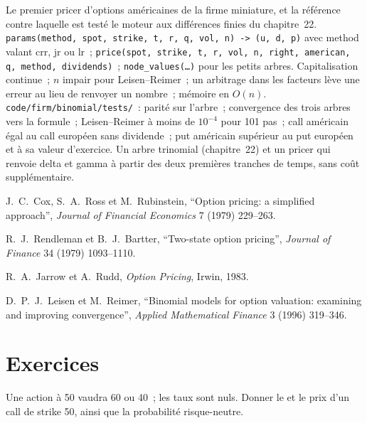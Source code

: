 \begin{build}
 Le premier pricer d'options américaines de la firme miniature, et la
référence contre laquelle est testé le moteur aux différences finies du chapitre~22. 
\texttt{params(method, spot, strike, t, r, q, vol, n) ->
(u, d, p)} avec method valant crr, jr ou lr~; \texttt{price(spot, strike, t, r, vol, n,
right, american, q, method, dividends)}~; \texttt{node\_values(\ldots)} pour les petits
arbres.
 Capitalisation continue~; $n$ impair pour Leisen--Reimer~; un arbitrage dans
les facteurs lève une erreur au lieu de renvoyer un nombre~; mémoire en $O(n)$.
 \texttt{code/firm/binomial/tests/}~: parité sur l'arbre~;
convergence des trois arbres vers la formule~; Leisen--Reimer à moins de $10^{-4}$ pour
101 pas~; call américain égal au call européen sans dividende~; put américain supérieur au put
européen et à sa valeur d'exercice.
 Un arbre trinomial (chapitre~22) et un pricer qui renvoie delta et
gamma à partir des deux premières tranches de temps, sans coût supplémentaire.
\end{build}

\begin{omsources}
\item J.~C.~Cox, S.~A.~Ross et M.~Rubinstein, ``Option pricing: a simplified
approach'', \emph{Journal of Financial Economics} 7 (1979) 229--263.
\item R.~J.~Rendleman et B.~J.~Bartter, ``Two-state option pricing'',
\emph{Journal of Finance} 34 (1979) 1093--1110.
\item R.~A.~Jarrow et A.~Rudd, \emph{Option Pricing}, Irwin, 1983.
\item D.~P.~J.~Leisen et M.~Reimer, ``Binomial models for option valuation:
examining and improving convergence'', \emph{Applied Mathematical Finance} 3
(1996) 319--346.
\end{omsources}

\section{Exercices}

\begin{exercise}[$\star$]\label{exo:dv:the-binomial-model:1}
Une action à 50 vaudra 60 ou 40~; les taux sont nuls. Donner le 
et le prix d'un call de strike 50, ainsi que la probabilité risque-neutre.
\end{exercise}

